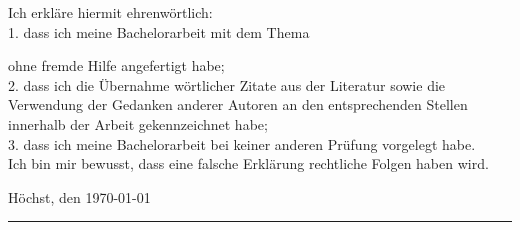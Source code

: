 Ich erkläre hiermit ehrenwörtlich:\\
1. dass ich meine Bachelorarbeit mit dem Thema\\
\begin{quote}
\textit{\titel}
\end{quote}

ohne fremde Hilfe angefertigt habe;\\
2. dass ich die Übernahme wörtlicher Zitate aus der Literatur sowie die Verwendung der Gedanken
anderer Autoren an den entsprechenden Stellen innerhalb der Arbeit gekennzeichnet habe;\\
3. dass ich meine Bachelorarbeit bei keiner anderen Prüfung vorgelegt habe.\\
Ich bin mir bewusst, dass eine falsche Erklärung rechtliche Folgen haben wird.





Höchst, den \today


\rule[-0.2cm]{5cm}{0.5pt}

\textsc{\autor} 
